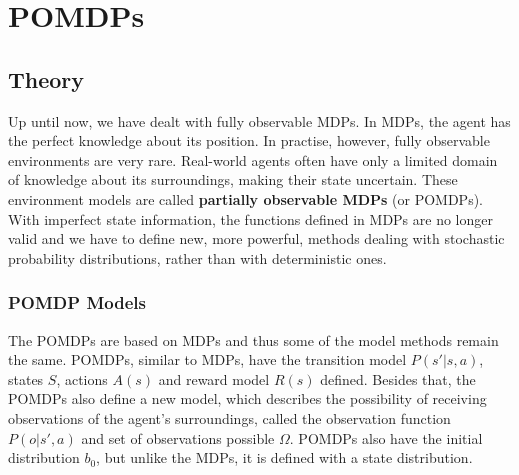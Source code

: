 \newcommand{\norm}[1]{\left\lVert#1\right\rVert}


\part{POMDPs}

\chapter{Theory}


Up until now, we have dealt with fully observable MDPs. In MDPs, the agent has the perfect knowledge about its position. In practise, however, fully observable environments are very rare. Real-world agents often have only a limited domain of knowledge about its surroundings, making their state uncertain. These environment models are called \textbf{partially observable MDPs} (or POMDPs). With imperfect state information, the functions defined in MDPs are no longer valid and we have to define new, more powerful, methods dealing with stochastic probability distributions, rather than with deterministic ones.

\section{POMDP Models}

The POMDPs are based on MDPs and thus some of the model methods remain the same. POMDPs, similar to MDPs, have the transition model $P(s'|s,a)$, states $S$, actions $A(s)$ and reward model $R(s)$ defined. Besides that, the POMDPs also define a new model, which describes the possibility of receiving observations of the agent's surroundings, called the observation function $P(o|s',a)$ and set of observations possible $\Omega$. POMDPs also have the initial distribution $b_0$, but unlike the MDPs, it is defined with a state distribution.


